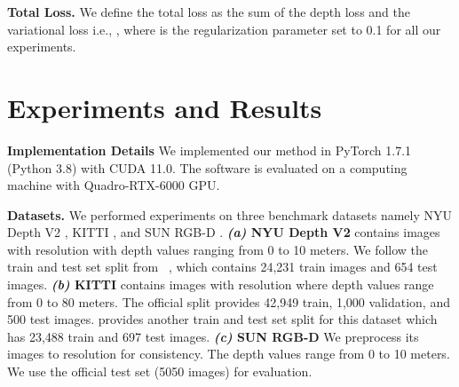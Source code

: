 \documentclass{article} \usepackage{iclr2023_conference, times}
\newcommand{\formattedparagraph}[1]{\noindent \textbf{#1}}
\begin{document}
\formattedparagraph{Total Loss.} We define the total loss as the sum of the depth loss and the variational loss i.e.,  , where  is the regularization parameter set to 0.1 for all our experiments.






\section{Experiments and Results}


\formattedparagraph{Implementation Details}
We implemented our method in PyTorch 1.7.1 (Python 3.8) with CUDA 11.0. The software is  evaluated on a computing machine with Quadro-RTX-6000 GPU.


\formattedparagraph{Datasets.} We performed experiments on three benchmark datasets namely NYU Depth V2 \citep{silberman2012indoor}, KITTI \citep{geiger2012we}, and SUN RGB-D \citep{song2015sun}. \textbf{\textit{(a)} NYU Depth V2} contains images with  resolution with depth values ranging from 0 to 10 meters.
We follow the train and test set split from ~\citet{lee2019big}, which contains 24,231 train images and 654 test images. \textbf{\textit{(b)} KITTI} contains images with  resolution where depth values range from 0 to 80 meters. The official split provides 42,949 train, 1,000 validation, and 500 test images. \citet{eigen2014depth} provides another train and test set split for this dataset which has 23,488 train and 697 test images. \textbf{\textit{(c)} SUN RGB-D} We preprocess its images to  resolution for consistency. The depth values range from 0 to 10 meters. We use the official test set (5050 images) for evaluation.
\end{document}
